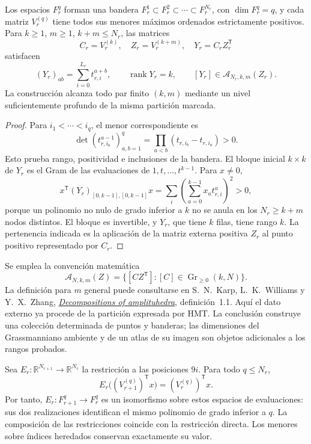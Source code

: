 \begin{theorem}
\label{thm:dim-all-ranks}
Los espacios \(F_r^q\) forman una bandera
\(F_r^1\subset F_r^2\subset\cdots\subset F_r^{N_r}\), con
\(\dim F_r^q=q\), y cada matriz \(V_r^{(q)}\) tiene todos sus
menores máximos ordenados estrictamente positivos. Para
\(k\geq1\), \(m\geq1\), \(k+m\leq N_r\), las matrices
\[
 C_r=V_r^{(k)},\quad Z_r=V_r^{(k+m)},\quad
 Y_r=C_rZ_r^{\mathsf T}
\]
satisfacen
\[
 (Y_r)_{ab}=\sum_{i=0}^{L_r}t_{r,i}^{a+b},\qquad
 \operatorname{rank}Y_r=k,\qquad
 [Y_r]\in\mathcal A_{N_r,k,m}(Z_r).
\]
La construcción alcanza todo par finito \((k,m)\) mediante un nivel
suficientemente profundo de la misma partición marcada.
\end{theorem}
\begin{proof}
Para \(i_1<\cdots<i_q\), el menor correspondiente es
\[
 \det(t_{r,i_b}^{a-1})_{a,b=1}^{q}
   =\prod_{a<b}(t_{r,i_b}-t_{r,i_a})>0.
\]
Esto prueba rango, positividad e inclusiones de la bandera. El bloque
inicial \(k\times k\) de \(Y_r\) es el Gram de las evaluaciones
de \(1,t,\ldots,t^{k-1}\). Para \(x\neq0\),
\[
 x^{\mathsf T}(Y_r)_{[0,k-1],[0,k-1]}x
 =\sum_i\left(\sum_{a=0}^{k-1}x_at_{r,i}^{a}\right)^2>0,
\]
porque un polinomio no nulo de grado inferior a \(k\) no se anula
en los \(N_r\geq k+m\) nodos distintos. El bloque es invertible,
y \(Y_r\), que tiene \(k\) filas, tiene rango \(k\).
La pertenencia indicada es la aplicación de la matriz externa positiva
\(Z_r\) al punto positivo representado por \(C_r\).
\end{proof}

Se emplea la convención matemática
\[
 \mathcal A_{N,k,m}(Z)=
 \{[CZ^{\mathsf T}]:[C]\in\operatorname{Gr}_{\geq0}(k,N)\}.
\]
La definición para \(m\) general puede consultarse en S.~N.~Karp,
L.~K.~Williams y Y.~X.~Zhang,
\href{https://people.math.harvard.edu/~williams/papers/amplituhedron-plus.pdf}
{\emph{Decompositions of amplituhedra}}, definición~1.1.
Aquí el dato externo ya procede de la partición expresada por HMT.
La conclusión construye una colección determinada de puntos y banderas;
las dimensiones del Grassmanniano ambiente y de un atlas de su imagen
son objetos adicionales a los rangos probados.

Sea \(E_r:\mathbb R^{N_{r+1}}\to\mathbb R^{N_r}\) la restricción
a las posiciones \(9i\). Para todo \(q\leq N_r\),
\[
 E_r\bigl((V_{r+1}^{(q)})^{\mathsf T}x\bigr)
       =(V_r^{(q)})^{\mathsf T}x.
\]
Por tanto, \(E_r:F_{r+1}^q\to F_r^q\) es un isomorfismo sobre
estos espacios de evaluaciones: sus dos realizaciones identifican el
mismo polinomio de grado inferior a \(q\). La composición de las
restricciones coincide con la restricción directa. Los menores sobre
índices heredados conservan exactamente su valor.

